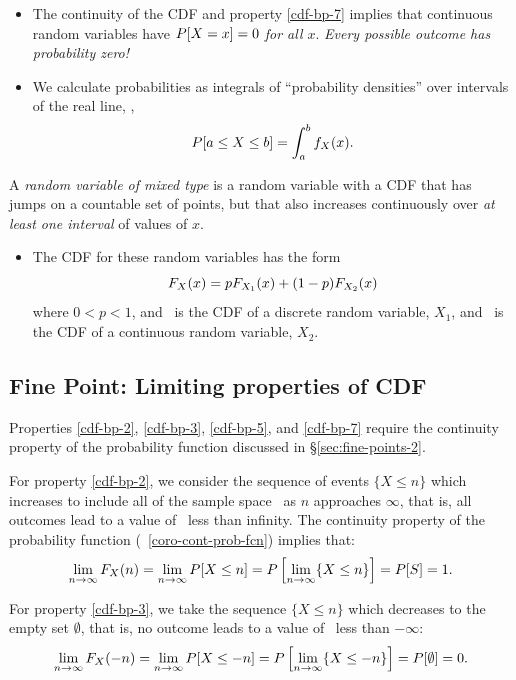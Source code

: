 	\begin{itemize}
		\item The continuity of the CDF and property \ref{cdf-bp-7} implies
		that continuous random variables have
		\emph{$P[X = x] = 0$ for all $x$}.
		\emph{Every possible outcome has probability zero!}


		\item  We calculate probabilities as
		integrals of ``probability densities'' over
		intervals of the real line,
		\ie,
		\[
			P[a\leq X\leq b] = \int_a^b f_{X}(x).
		\]
	\end{itemize}


	\item A \emph{random variable of mixed type}
	is a random variable with a CDF that has jumps
	on a countable set of points,
	but that also increases continuously over
	\emph{at least one interval} of values of $x$.
	\begin{itemize}
		\item The CDF for these random variables has
		the form
		\[
			F_{X}(x) = p F_{X_1}(x) + (1-p) F_{X_2}(x)
		\]
		where $0 < p < 1$,
		and \ is the CDF of a discrete random variable, $X_1$,
		and \ is the CDF of a continuous random variable, $X_2$.
	\end{itemize}
\eit

\subsection{Fine Point: Limiting properties of CDF \optional}

\bit
	\item Properties
	\ref{cdf-bp-2},
	\ref{cdf-bp-3},
	\ref{cdf-bp-5},
	and
	\ref{cdf-bp-7}
	require the continuity property of the probability function
	discussed in \S\ref{sec:fine-points-2}.

	\item For {property \ref{cdf-bp-2}},
	we consider the sequence of events $\{X \leq n\}$
	which increases to include all of the sample space \sspace\
	as $n$ approaches $\infty$,
	that is,
	all outcomes lead to a value of \X\ less than infinity. 
	The continuity property of the probability function
	(\corollaryname~\ref{coro-cont-prob-fcn}) implies that:
	\[
		\lim_{n\to\infty} F_{X}(n) =
		\lim_{n\to\infty} P[X\leq n] =
		P\left[ \lim_{n\to\infty} \{X\leq n\} \right] =
		P[S] =
		1.
	\]

	\item For {property \ref{cdf-bp-3}},
	we take the sequence $\{X \leq n\}$
	which decreases to the empty set $\emptyset$,
	that is, no outcome leads to a value of \X\ less than $-\infty$:
	\[
		\lim_{n\to\infty} F_{X}(-n) =
		\lim_{n\to\infty} P[X\leq -n] =
		P\left[ \lim_{n\to\infty} \{X\leq -n\} \right] =
		P[\emptyset] =
		0.
	\]

